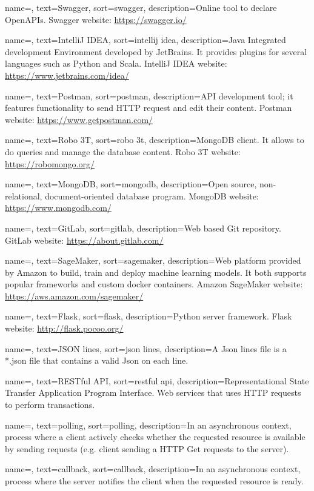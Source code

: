 {
	name=,
	text=Swagger,
	sort=swagger,
	description={Online tool to declare OpenAPIs. Swagger website: \url{https://swagger.io/}}
}

{
	name=,
	text=IntelliJ IDEA,
	sort=intellij idea,
	description={Java Integrated development Environment developed by JetBrains. It provides plugins for several languages such as Python and Scala. IntelliJ IDEA website: \url{https://www.jetbrains.com/idea/}}
}

{
	name=,
	text=Postman,
	sort=postman,
	description={API development tool; it features functionality to send HTTP request and edit their content. Postman website: \url{https://www.getpostman.com/}}
}

{
	name=,
	text=Robo 3T,
	sort=robo 3t,
	description={MongoDB client. It allows to do queries and manage the database content. Robo 3T website: \url{https://robomongo.org/}}
}

{
	name=,
	text=MongoDB,
	sort=mongodb,
	description={Open source, non-relational, document-oriented database program. MongoDB website: \url{https://www.mongodb.com/}}
}

{
	name=,
	text=GitLab,
	sort=gitlab,
	description={Web based Git repository. GitLab website: \url{https://about.gitlab.com/}}
}

{
	name=,
	text=SageMaker,
	sort=sagemaker,
	description={Web platform provided by Amazon to build, train and deploy machine learning models. It both supports popular frameworks and custom docker containers. Amazon SageMaker website: \url{https://aws.amazon.com/sagemaker/}}
}

{
	name=,
	text=Flask,
	sort=flask,
	description={Python server framework. Flask website: \url{http://flask.pocoo.org/}}
}

{
	name=,
	text=JSON lines,
	sort=json lines,
	description={A Json lines file is a *.json file that contains a valid Json on each line.}
}

{
	name=,
	text=RESTful API,
	sort=restful api,
	description={Representational State Transfer Application Program Interface. Web services that uses HTTP requests to perform transactions.}
}

{
	name=,
	text=polling,
	sort=polling,
	description={In an asynchronous context, process where a client actively checks whether the requested resource is available by sending requests (e.g. client sending a HTTP Get requests to the server).}
}

{
	name=,
	text=callback,
	sort=callback,
	description={In an asynchronous context, process where the server notifies the client when the requested resource is ready.}
}
